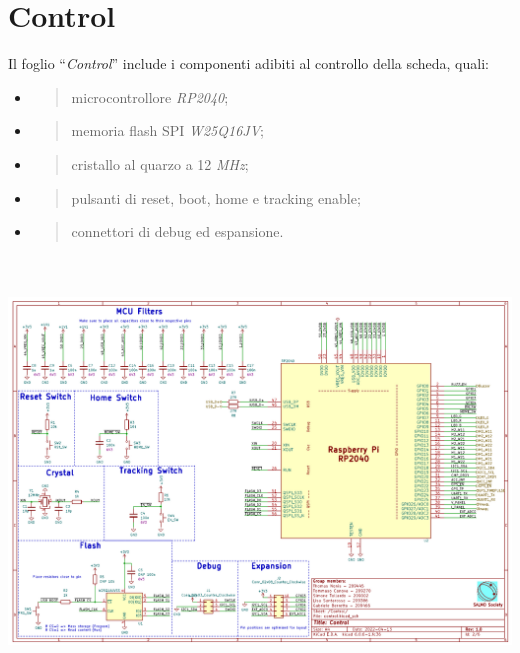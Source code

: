 \hypertarget{control}{%
\section{Control}\label{control}}

Il foglio ``\emph{Control}'' include i componenti adibiti al controllo
della scheda, quali:

\begin{itemize}
\item
  \begin{quote}
  microcontrollore \emph{RP2040};
  \end{quote}
\item
  \begin{quote}
  memoria flash SPI \emph{W25Q16JV};
  \end{quote}
\item
  \begin{quote}
  cristallo al quarzo a 12 \emph{MHz};
  \end{quote}
\item
  \begin{quote}
  pulsanti di reset, boot, home e tracking enable;
  \end{quote}
\item
  \begin{quote}
  connettori di debug ed espansione.
  \end{quote}
\end{itemize}

\begin{center}
\includegraphics[width=6.5in,height=4.48611in]{figures/image40.png}
\captionsetup{type=figure}
\end{center}

